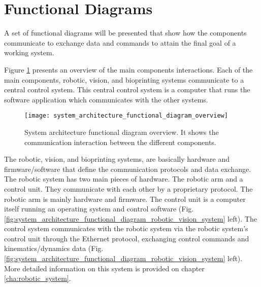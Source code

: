


\section{Functional Diagrams}
\label{sec:system_architecture_functional_diagrams}

A set of functional diagrams will be presented that show how the components communicate to exchange data and commands to attain the final goal of a working system.

Figure \ref{fig:system_architecture_functional_diagram_overview} presents an overview of the main components interactions. Each of the main components, robotic, vision, and bioprinting systems communicate to a central control system. This central control system is a computer that runs the software application which communicates with the other systems.

\begin{figure}[htbp]
	\centering
	\texttt{[image: system\_architecture\_functional\_diagram\_overview]}
	\caption[System architecture functional diagram overview.]{System architecture functional diagram overview. It shows the communication interaction between the different components.}
	\label{fig:system_architecture_functional_diagram_overview}
\end{figure}

The robotic, vision, and bioprinting systems, are basically hardware and firmware/software that define the communication protocols and data exchange.\\

The robotic system has two main pieces of hardware. The robotic arm and a control unit. They communicate with each other by a proprietary protocol. The robotic arm is mainly hardware and firmware. The control unit is a computer itself running an operating system and control software (Fig. \ref{fig:system_architecture_functional_diagram_robotic_vision_system} left). The control system communicates with the robotic system via the robotic system's control unit through the Ethernet protocol, exchanging control commands and kinematics/dynamics data (Fig. \ref{fig:system_architecture_functional_diagram_robotic_vision_system} left). More detailed information on this system is provided on chapter \ref{cha:robotic_system}.


